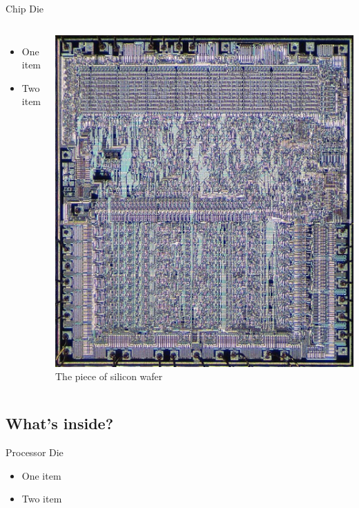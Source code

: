 \documentclass{beamer}
\begin{document}
\begin{frame}{Chip Die}
  \begin{columns}
    \begin{itemize}
    \item
      One item
    \item
      Two item
    \end{itemize}

    \begin{center}
      \includegraphics[scale=0.25]{../assets/MOS_6502_die.eps}
      \cite{MOS6502Die} The piece of silicon wafer 

    \end{center}
  \end{columns}
\end{frame}


\subsection[Internals]{What's inside?}

\begin{frame}{Processor Die}
  \begin{itemize}
  \item
    One item
  \item
    Two item
  \end{itemize}
\end{frame}
\end{document}
